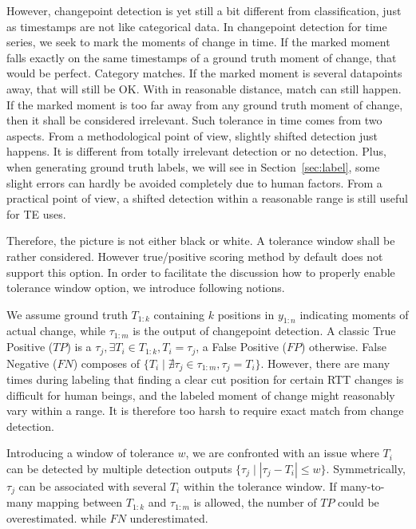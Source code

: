 However, changepoint detection is yet still a bit different from classification, just as timestamps are not like categorical data.
In changepoint detection for time series, we seek to mark the moments of change in time. 
If the marked moment falls exactly on the same timestamps of a ground truth moment of change, that would be perfect. Category matches.
If the marked moment is several datapoints away, that will still be OK.
With in reasonable distance, match can still happen.
If the marked moment is too far away from any ground truth moment of change, then it shall be considered irrelevant.
Such tolerance in time comes from two aspects.
From a methodological point of view, slightly shifted detection just happens. 
It is different from totally irrelevant detection or no detection.
Plus, when generating ground truth labels, we will see in Section~\ref{sec:label}, some slight errors can hardly be avoided completely due to human factors.
From a practical point of view, a shifted detection within a reasonable range is still useful for TE uses.

Therefore, the picture is not either black or white.
A tolerance window shall be rather considered.
However true/positive scoring method by default does not support this option.
In order to facilitate the discussion how to properly enable tolerance window option, we introduce following notions.

We assume ground truth $T_{1:k}$ containing $k$ positions in $y_{1:n}$ indicating moments of actual change, while $\tau_{1:m}$ is the output of changepoint detection.
A classic True Positive ($TP$) is a $\tau_j, \exists T_i \in T_{1:k}, T_i = \tau_j$, a False Positive ($FP$) otherwise. False Negative ($FN$) composes of $\{T_i \mid \nexists \tau_j \in \tau_{1:m}, \tau_j = T_i \}$.
However, there are many times during labeling that finding a clear cut position for certain RTT changes is difficult for human beings, and the labeled moment of change might reasonably vary within a range.
It is therefore too harsh to require exact match from change detection.

Introducing a window of tolerance $w$, we are confronted with an issue where 
$T_i$ can be detected by multiple detection outputs $ \{\tau_j \mid |\tau_j - T_i| \leq w \}$. 
Symmetrically, $\tau_j$ can be associated with several $T_i$ within the tolerance window.
If many-to-many mapping between $T_{1:k}$ and $\tau_{1:m}$ is allowed, the number of $TP$ could be overestimated. while $FN$ underestimated.

